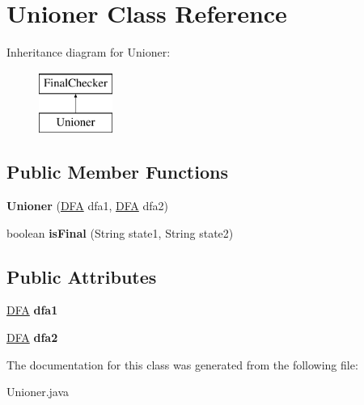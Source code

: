 \hypertarget{class_unioner}{}\section{Unioner Class Reference}
\label{class_unioner}
Inheritance diagram for Unioner\+:\begin{figure}[H]
\begin{center}
\leavevmode
\includegraphics[height=2.000000cm]{class_unioner}
\end{center}
\end{figure}
\subsection*{Public Member Functions}
\begin{DoxyCompactItemize}
\item 
\mbox{\label{class_unioner_a0ad87cabe37f2f501ec0149a40e41537}} 
{\bfseries Unioner} (\mbox{\hyperlink{class_d_f_a}{D\+FA}} dfa1, \mbox{\hyperlink{class_d_f_a}{D\+FA}} dfa2)
\item 
\mbox{\label{class_unioner_ab186142cb7f9383da0e4de5b1855526d}} 
boolean {\bfseries is\+Final} (String state1, String state2)
\end{DoxyCompactItemize}
\subsection*{Public Attributes}
\begin{DoxyCompactItemize}
\item 
\mbox{\label{class_unioner_a07b10ea23d48f0a35de3467dff6db660}} 
\mbox{\hyperlink{class_d_f_a}{D\+FA}} {\bfseries dfa1}
\item 
\mbox{\label{class_unioner_a634a84119a6ebae00dcc820534349223}} 
\mbox{\hyperlink{class_d_f_a}{D\+FA}} {\bfseries dfa2}
\end{DoxyCompactItemize}


The documentation for this class was generated from the following file\+:\begin{DoxyCompactItemize}
\item 
Unioner.\+java\end{DoxyCompactItemize}
